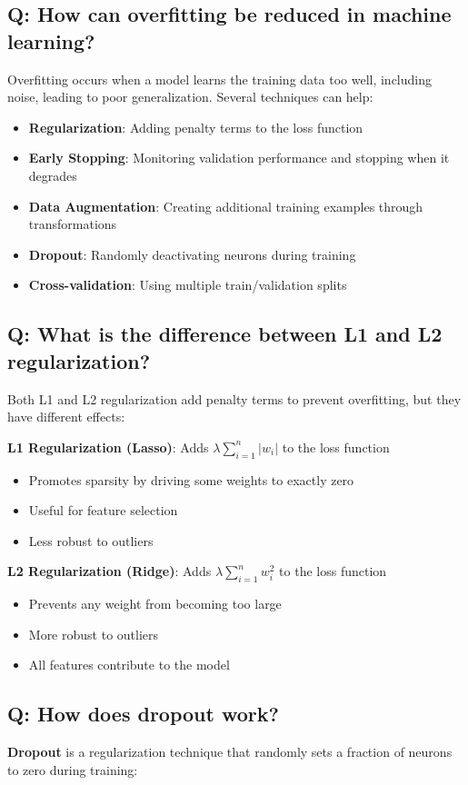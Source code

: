 \subsection*{\textcolor{primaryteal}{Q: How can overfitting be reduced in machine learning?}}
Overfitting occurs when a model learns the training data too well, including noise, leading to poor generalization. Several techniques can help:

\begin{itemize}
	\item \textbf{Regularization}: Adding penalty terms to the loss function
	\item \textbf{Early Stopping}: Monitoring validation performance and stopping when it degrades
	\item \textbf{Data Augmentation}: Creating additional training examples through transformations
	\item \textbf{Dropout}: Randomly deactivating neurons during training
	\item \textbf{Cross-validation}: Using multiple train/validation splits
\end{itemize}

\subsection*{\textcolor{primaryteal}{Q: What is the difference between L1 and L2 regularization?}}
Both L1 and L2 regularization add penalty terms to prevent overfitting, but they have different effects:

\textbf{L1 Regularization (Lasso)}: Adds $\lambda \sum_{i=1}^{n} |w_i|$ to the loss function
\begin{itemize}
	\item Promotes sparsity by driving some weights to exactly zero
	\item Useful for feature selection
	\item Less robust to outliers
\end{itemize}

\textbf{L2 Regularization (Ridge)}: Adds $\lambda \sum_{i=1}^{n} w_i^2$ to the loss function
\begin{itemize}
	\item Prevents any weight from becoming too large
	\item More robust to outliers
	\item All features contribute to the model
\end{itemize}

\subsection*{\textcolor{primaryteal}{Q: How does dropout work?}}
\textbf{Dropout} is a regularization technique that randomly sets a fraction of neurons to zero during training:


